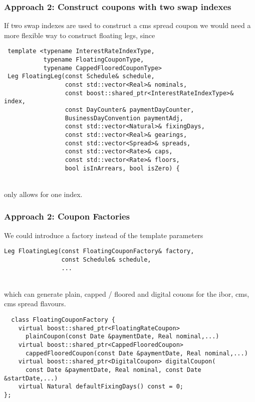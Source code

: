 \documentclass{beamer}
\begin{document}
\begin{frame}[fragile]
\frametitle{Approach 2: Construct coupons with two swap indexes}
If two swap indexes are used to construct a cms spread coupon we would need
a more flexible way to construct floating legs, since
\vspace{2mm}
\begin{verbatim}
 template <typename InterestRateIndexType,
           typename FloatingCouponType,
           typename CappedFlooredCouponType>
 Leg FloatingLeg(const Schedule& schedule,
                 const std::vector<Real>& nominals,
                 const boost::shared_ptr<InterestRateIndexType>& index,
                 const DayCounter& paymentDayCounter,
                 BusinessDayConvention paymentAdj,
                 const std::vector<Natural>& fixingDays,
                 const std::vector<Real>& gearings,
                 const std::vector<Spread>& spreads,
                 const std::vector<Rate>& caps,
                 const std::vector<Rate>& floors,
                 bool isInArrears, bool isZero) {
\end{verbatim}
\\
\vspace{2mm}
only allows for one index. 
\end{frame}

\begin{frame}[fragile]
\frametitle{Approach 2: Coupon Factories}
We could introduce a factory instead of the template parameters
\vspace{2mm}
\begin{verbatim}
Leg FloatingLeg(const FloatingCouponFactory& factory,
                const Schedule& schedule,
                ...
\end{verbatim}
\\
\vspace{2mm}
which can generate plain, capped / floored and digital
couons for the ibor, cms, cms spread flavours.
\vspace{2mm}
\begin{verbatim}
  class FloatingCouponFactory {
    virtual boost::shared_ptr<FloatingRateCoupon>
      plainCoupon(const Date &paymentDate, Real nominal,...)
    virtual boost::shared_ptr<CappedFlooredCoupon>
      cappedFlooredCoupon(const Date &paymentDate, Real nominal,...)
    virtual boost::shared_ptr<DigitalCoupon> digitalCoupon(
      const Date &paymentDate, Real nominal, const Date &startDate,...)
    virtual Natural defaultFixingDays() const = 0;
};
\end{verbatim}

\end{frame}
\end{document}
